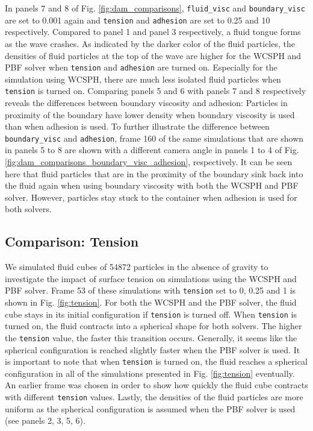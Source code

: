 \documentclass[11pt, letterpaper, twocolumn]{article}
\begin{document}
In panels 7 and 8 of Fig. \ref{fig:dam_comparisons}, \texttt{fluid\_visc} and \texttt{boundary\_visc} are set to 0.001 again and \texttt{tension} and \texttt{adhesion} are set to 0.25 and 10 respectively. Compared to panel 1 and panel 3 respectively, a fluid tongue forms as the wave crashes. As indicated by the darker color of the fluid particles, 
the densities of fluid particles at the top of the wave are higher for the WCSPH and PBF solver when \texttt{tension} and \texttt{adhesion} are turned on. Especially for the simulation using WCSPH, there are much less isolated fluid particles when \texttt{tension} is turned on. Comparing panels 5 and 6 with panels 7 and 8 respectively reveals the 
differences between boundary viscosity and adhesion: Particles in proximity of the boundary have lower density when boundary viscosity is used than when adhesion is used. To further illustrate the difference between \texttt{boundary\_visc} and \texttt{adhesion}, frame 160 of the same simulations that are shown in panels 5 to 8 are shown with a
different camera angle in panels 1 to 4 of Fig. \ref{fig:dam_comparisons_boundary_visc_adhesion}, respectively. It can be seen here that fluid particles that are in the proximity of the boundary sink back into the fluid again when using boundary viscosity with both the WCSPH and PBF solver. However, particles stay stuck to the container when adhesion
is used for both solvers. 

\subsection{Comparison: Tension}
\label{subsec:comparison_tension}

We simulated fluid cubes of 54872 particles in the absence of gravity to investigate the impact of surface tension on simulations using the WCSPH and PBF solver. Frame 53 of these simulations with \texttt{tension} set to 0, 0.25 and 1 is shown in Fig. \ref{fig:tension}. For both the WCSPH and the PBF solver, the fluid cube stays in its initial configuration
if \texttt{tension} is turned off. When \texttt{tension} is turned on, the fluid contracts into a spherical shape for both solvers. The higher the \texttt{tension} value, the faster this transition occurs. Generally, it seems like the spherical configuration is reached slightly faster when the PBF solver is used. It is important to note that when 
\texttt{tension} is turned on, the fluid reaches a spherical configuration in all of the simulations presented in Fig. \ref{fig:tension} eventually. An earlier frame was chosen in order to show how quickly the fluid cube contracts with different \texttt{tension} values. Lastly, the densities of the fluid particles are more uniform as the spherical configuration
is assumed when the PBF solver is used (see panels 2, 3, 5, 6).
\end{document}

